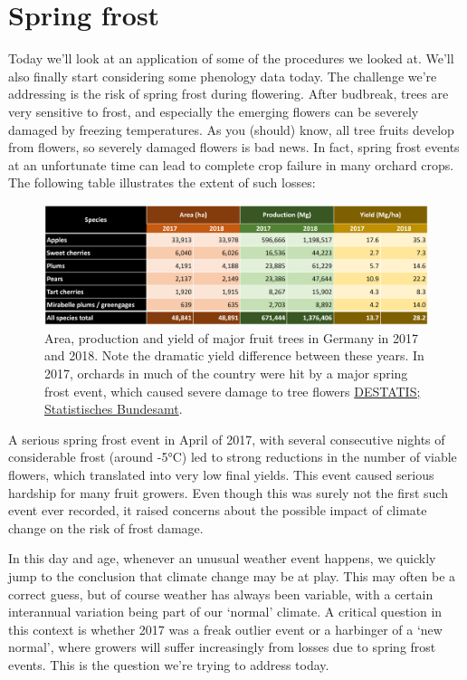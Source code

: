 \documentclass[
]{book}
\begin{document}
\hypertarget{spring-frost}{%
\section{Spring frost}\label{spring-frost}}

Today we'll look at an application of some of the procedures we looked at. We'll also finally start considering some phenology data today. The challenge we're addressing is the risk of spring frost during flowering. After budbreak, trees are very sensitive to frost, and especially the emerging flowers can be severely damaged by freezing temperatures. As you (should) know, all tree fruits develop from flowers, so severely damaged flowers is bad news. In fact, spring frost events at an unfortunate time can lead to complete crop failure in many orchard crops. The following table illustrates the extent of such losses:

\begin{figure}
\centering
\includegraphics{pictures/frost_damage_Germany.png}
\caption{Area, production and yield of major fruit trees in Germany in 2017 and 2018. Note the dramatic yield difference between these years. In 2017, orchards in much of the country were hit by a major spring frost event, which caused severe damage to tree flowers \href{https://www.destatis.de/DE/Themen/Branchen-Unternehmen/Landwirtschaft-Forstwirtschaft-Fischerei/Obst-Gemuese-Gartenbau/Tabellen/flaechen-erntemengen-marktobstanbau.html}{DESTATIS; Statistisches Bundesamt}.}
\end{figure}

A serious spring frost event in April of 2017, with several consecutive nights of considerable frost (around -5°C) led to strong reductions in the number of viable flowers, which translated into very low final yields. This event caused serious hardship for many fruit growers. Even though this was surely not the first such event ever recorded, it raised concerns about the possible impact of climate change on the risk of frost damage.

In this day and age, whenever an unusual weather event happens, we quickly jump to the conclusion that climate change may be at play. This may often be a correct guess, but of course weather has always been variable, with a certain interannual variation being part of our `normal' climate. A critical question in this context is whether 2017 was a freak outlier event or a harbinger of a `new normal', where growers will suffer increasingly from losses due to spring frost events. This is the question we're trying to address today.
\end{document}

